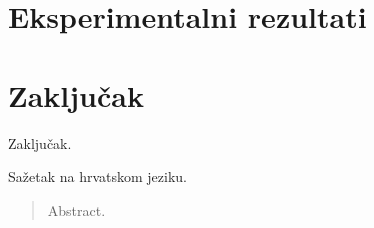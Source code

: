 \documentclass[times, utf8, diplomski]{fer}
\begin{document}
\chapter{Eksperimentalni rezultati}


\chapter{Zaključak}
Zaključak.




\begin{sazetak}
Sažetak na hrvatskom jeziku.

\end{sazetak}

\begin{abstract}
Abstract.

\end{abstract}
\end{document}
